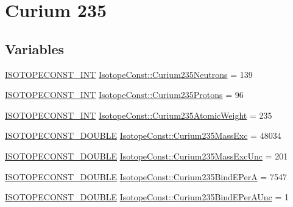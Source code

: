 \hypertarget{group___isotope_const-_curium-_cm235}{}\section{Curium 235}
\label{group___isotope_const-_curium-_cm235}
\subsection*{Variables}
\begin{DoxyCompactItemize}
\item 
\mbox{\hyperlink{group___isotope_const-_macros_ga5f18360b3e99483a35c32d789e62621c}{I\+S\+O\+T\+O\+P\+E\+C\+O\+N\+S\+T\+\_\+\+I\+NT}} \mbox{\hyperlink{group___isotope_const-_curium-_cm235_ga39892b435e37cebf0c2fa6a7925a3ad2}{Isotope\+Const\+::\+Curium235\+Neutrons}} = 139
\item 
\mbox{\hyperlink{group___isotope_const-_macros_ga5f18360b3e99483a35c32d789e62621c}{I\+S\+O\+T\+O\+P\+E\+C\+O\+N\+S\+T\+\_\+\+I\+NT}} \mbox{\hyperlink{group___isotope_const-_curium-_cm235_gacfb5ddf2abcbb42ce22979be29e958f8}{Isotope\+Const\+::\+Curium235\+Protons}} = 96
\item 
\mbox{\hyperlink{group___isotope_const-_macros_ga5f18360b3e99483a35c32d789e62621c}{I\+S\+O\+T\+O\+P\+E\+C\+O\+N\+S\+T\+\_\+\+I\+NT}} \mbox{\hyperlink{group___isotope_const-_curium-_cm235_gaa244b02e63ddfe3cb7950fb7bedeb406}{Isotope\+Const\+::\+Curium235\+Atomic\+Weight}} = 235
\item 
\mbox{\hyperlink{group___isotope_const-_macros_ga8f45a7272ce02c0b4c65c44636ed719a}{I\+S\+O\+T\+O\+P\+E\+C\+O\+N\+S\+T\+\_\+\+D\+O\+U\+B\+LE}} \mbox{\hyperlink{group___isotope_const-_curium-_cm235_gaddf6996ec127c0ec073a04577baace5d}{Isotope\+Const\+::\+Curium235\+Mass\+Exc}} = 48034
\item 
\mbox{\hyperlink{group___isotope_const-_macros_ga8f45a7272ce02c0b4c65c44636ed719a}{I\+S\+O\+T\+O\+P\+E\+C\+O\+N\+S\+T\+\_\+\+D\+O\+U\+B\+LE}} \mbox{\hyperlink{group___isotope_const-_curium-_cm235_ga5dd5a0d089d51a34cfdeb23920fe270d}{Isotope\+Const\+::\+Curium235\+Mass\+Exc\+Unc}} = 201
\item 
\mbox{\hyperlink{group___isotope_const-_macros_ga8f45a7272ce02c0b4c65c44636ed719a}{I\+S\+O\+T\+O\+P\+E\+C\+O\+N\+S\+T\+\_\+\+D\+O\+U\+B\+LE}} \mbox{\hyperlink{group___isotope_const-_curium-_cm235_ga32e5747a86a6ac8c412eb830dc8760d0}{Isotope\+Const\+::\+Curium235\+Bind\+E\+PerA}} = 7547
\item 
\mbox{\hyperlink{group___isotope_const-_macros_ga8f45a7272ce02c0b4c65c44636ed719a}{I\+S\+O\+T\+O\+P\+E\+C\+O\+N\+S\+T\+\_\+\+D\+O\+U\+B\+LE}} \mbox{\hyperlink{group___isotope_const-_curium-_cm235_ga7578a6de6b716a536fdf09051cb34594}{Isotope\+Const\+::\+Curium235\+Bind\+E\+Per\+A\+Unc}} = 1

\end{DoxyCompactItemize}
